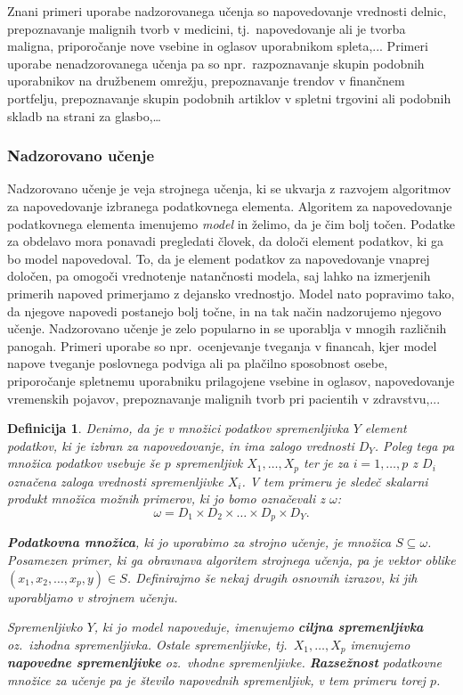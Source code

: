 \documentclass[12pt,a4paper]{article}
\newtheorem{definicija}{Definicija}
\begin{document}
Znani primeri uporabe nadzorovanega učenja so napovedovanje vrednosti delnic, prepoznavanje malignih tvorb v medicini, tj.~napovedovanje ali je tvorba maligna, priporočanje nove vsebine in oglasov uporabnikom spleta,... 
Primeri uporabe nenadzorovanega učenja pa so npr.\ razpoznavanje skupin podobnih uporabnikov na družbenem omrežju, prepoznavanje trendov v finančnem portfelju, prepoznavanje skupin podobnih artiklov v spletni trgovini ali podobnih skladb na strani za glasbo,\dots


\subsubsection{Nadzorovano učenje}

Nadzorovano učenje je veja strojnega učenja, ki se ukvarja z razvojem algoritmov za napovedovanje izbranega podatkovnega elementa. 
Algoritem za napovedovanje podatkovnega elementa imenujemo \emph{model} in želimo, da je čim bolj točen. 
Podatke za obdelavo mora ponavadi pregledati človek, da določi element podatkov, ki ga bo model napovedoval.
To, da je element podatkov za napovedovanje vnaprej določen, pa omogoči vrednotenje natančnosti modela, saj lahko na izmerjenih primerih napoved primerjamo z dejansko vrednostjo. 
Model nato popravimo tako, da njegove napovedi postanejo bolj točne, in na tak način nadzorujemo njegovo učenje. 
Nadzorovano učenje je zelo popularno in se uporablja v mnogih različnih panogah. Primeri uporabe so 
npr.\ ocenjevanje tveganja v financah, kjer model napove tveganje poslovnega podviga ali pa plačilno sposobnost osebe, 
priporočanje spletnemu uporabniku prilagojene vsebine in oglasov, napovedovanje vremenskih pojavov, prepoznavanje malignih tvorb pri pacientih v zdravstvu,...

\begin{definicija}
Denimo, da je v množici podatkov spremenljivka $Y$ element podatkov, ki je izbran za napovedovanje, in ima zalogo vrednosti $D_Y$. 
Poleg tega pa množica podatkov vsebuje še $p$ spremenljivk $X_1, \ldots , X_p$ ter je za $i = 1, \ldots, p$ z $D_i$ označena zaloga vrednosti spremenljivke $X_i$. 
V tem primeru je sledeč skalarni produkt množica možnih primerov, ki jo bomo označevali z $\omega$:
$$
\omega = D_1 \times D_2 \times \dots \times D_p \times D_Y.
$$

\textbf{Podatkovna množica}, ki jo uporabimo za strojno učenje, je množica $S \subseteq \omega$. 
Posamezen primer, ki ga obravnava algoritem strojnega učenja, pa je vektor oblike $(x_1, x_2, \ldots , x_p, y) \in S$. 
Definirajmo še nekaj drugih osnovnih izrazov, ki jih uporabljamo v strojnem učenju.

Spremenljivko $Y$, ki jo model napoveduje, imenujemo \textbf{ciljna spremenljivka} oz.~izhodna spremenljivka. 
Ostale spremenljivke, tj.~$X_1, \ldots , X_p$ imenujemo \textbf{napovedne spremenljivke} oz.~vhodne spremenljivke. 
\textbf{Razsežnost} podatkovne množice za učenje pa je število napovednih spremenljivk, v tem primeru torej $p$.
\end{definicija}
\end{document}
